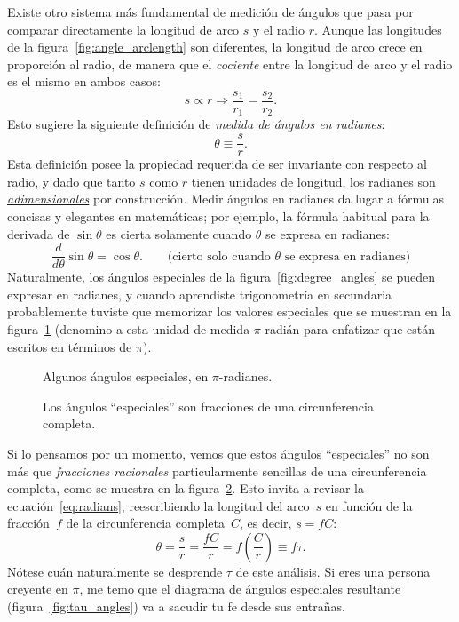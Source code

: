 Existe otro sistema más fundamental de medición de ángulos que pasa por comparar directamente la longitud de arco $s$ y el radio $r$. Aunque las longitudes de la figura~\ref{fig:angle_arclength} son diferentes, la longitud de arco crece en proporción al radio, de manera que el \emph{cociente} entre la longitud de arco y el radio es el mismo en ambos casos:
\[
s\propto r \Rightarrow \frac{s_1}{r_1} = \frac{s_2}{r_2}.
\]
Esto sugiere la siguiente definición de  \emph{medida de ángulos en radianes}:
\begin{equation}
\label{eq:radians}
\theta \equiv \frac{s}{r}.
\end{equation}
Esta definición posee la propiedad requerida de ser invariante con respecto al radio, y dado que tanto  $s$ como $r$ tienen unidades de longitud, los radianes son  \href{https://es.wikipedia.org/wiki/Magnitud_adimensional}{\emph{adimensionales}} por construcción. Medir ángulos en radianes da lugar a fórmulas concisas y elegantes en matemáticas; por ejemplo, la fórmula habitual para la derivada de  $\sin\theta$ es cierta solamente cuando  $\theta$ se expresa en radianes:
\[
  \frac{d}{d\theta}\sin\theta = \cos\theta. \qquad\mbox{(cierto solo cuando $\theta$ se expresa en radianes)}
\]
Naturalmente, los ángulos especiales de la figura~\ref{fig:degree_angles} se pueden expresar en radianes, y cuando aprendiste trigonometría en secundaria probablemente tuviste que memorizar los valores especiales que se muestran en la figura~\ref{fig:pi_angles} (denomino a esta unidad de medida $\pi$-radián para enfatizar que están escritos en términos de $\pi$).

\begin{figure}
\begin{center}
\end{center}
\caption{Algunos ángulos especiales, en $\pi$-radianes.\label{fig:pi_angles}}
\end{figure}

\begin{figure}
\begin{center}
\end{center}
\caption{Los ángulos ``especiales'' son fracciones de una circunferencia completa.\label{fig:angle_fractions}}
\end{figure}

Si lo pensamos por un momento, vemos que estos ángulos ``especiales'' no son más que  \emph{fracciones racionales} particularmente sencillas de una circunferencia completa, como se muestra en la figura~\ref{fig:angle_fractions}. Esto invita a revisar la ecuación~\eqref{eq:radians}, reescribiendo la longitud del arco~$s$ en función de la fracción~$f$ de la circunferencia completa~$C$, es decir, $s = f C$:
\[ \theta = \frac{s}{r} = \frac{fC}{r} =  f\left(\frac{C}{r}\right) \equiv f\tau. \]
Nótese cuán naturalmente se desprende $\tau$ de este análisis. Si eres una persona creyente en $\pi$, me temo que el diagrama  de ángulos especiales resultante (figura~\ref{fig:tau_angles}) va a sacudir tu fe desde sus entrañas.

